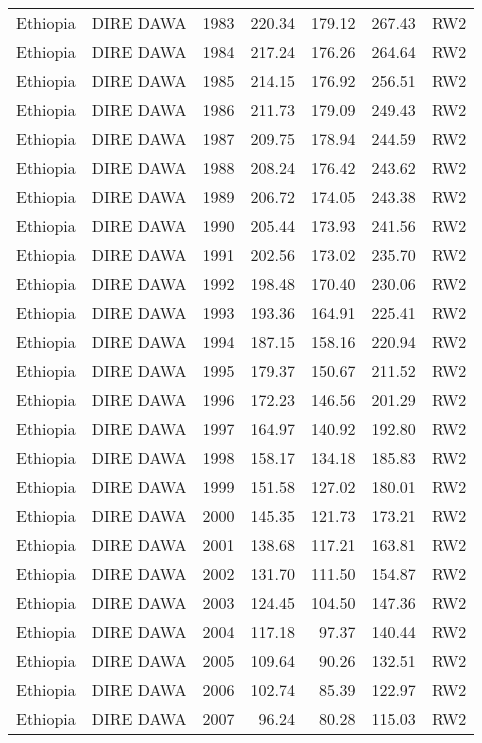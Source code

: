 \begin{longtable}{lllrrrl}
  Ethiopia & DIRE DAWA & 1983 & 220.34 & 179.12 & 267.43 & RW2 \\ 
  Ethiopia & DIRE DAWA & 1984 & 217.24 & 176.26 & 264.64 & RW2 \\ 
  Ethiopia & DIRE DAWA & 1985 & 214.15 & 176.92 & 256.51 & RW2 \\ 
  Ethiopia & DIRE DAWA & 1986 & 211.73 & 179.09 & 249.43 & RW2 \\ 
  Ethiopia & DIRE DAWA & 1987 & 209.75 & 178.94 & 244.59 & RW2 \\ 
  Ethiopia & DIRE DAWA & 1988 & 208.24 & 176.42 & 243.62 & RW2 \\ 
  Ethiopia & DIRE DAWA & 1989 & 206.72 & 174.05 & 243.38 & RW2 \\ 
  Ethiopia & DIRE DAWA & 1990 & 205.44 & 173.93 & 241.56 & RW2 \\ 
  Ethiopia & DIRE DAWA & 1991 & 202.56 & 173.02 & 235.70 & RW2 \\ 
  Ethiopia & DIRE DAWA & 1992 & 198.48 & 170.40 & 230.06 & RW2 \\ 
  Ethiopia & DIRE DAWA & 1993 & 193.36 & 164.91 & 225.41 & RW2 \\ 
  Ethiopia & DIRE DAWA & 1994 & 187.15 & 158.16 & 220.94 & RW2 \\ 
  Ethiopia & DIRE DAWA & 1995 & 179.37 & 150.67 & 211.52 & RW2 \\ 
  Ethiopia & DIRE DAWA & 1996 & 172.23 & 146.56 & 201.29 & RW2 \\ 
  Ethiopia & DIRE DAWA & 1997 & 164.97 & 140.92 & 192.80 & RW2 \\ 
  Ethiopia & DIRE DAWA & 1998 & 158.17 & 134.18 & 185.83 & RW2 \\ 
  Ethiopia & DIRE DAWA & 1999 & 151.58 & 127.02 & 180.01 & RW2 \\ 
  Ethiopia & DIRE DAWA & 2000 & 145.35 & 121.73 & 173.21 & RW2 \\ 
  Ethiopia & DIRE DAWA & 2001 & 138.68 & 117.21 & 163.81 & RW2 \\ 
  Ethiopia & DIRE DAWA & 2002 & 131.70 & 111.50 & 154.87 & RW2 \\ 
  Ethiopia & DIRE DAWA & 2003 & 124.45 & 104.50 & 147.36 & RW2 \\ 
  Ethiopia & DIRE DAWA & 2004 & 117.18 & 97.37 & 140.44 & RW2 \\ 
  Ethiopia & DIRE DAWA & 2005 & 109.64 & 90.26 & 132.51 & RW2 \\ 
  Ethiopia & DIRE DAWA & 2006 & 102.74 & 85.39 & 122.97 & RW2 \\ 
  Ethiopia & DIRE DAWA & 2007 & 96.24 & 80.28 & 115.03 & RW2 \\ 

\end{longtable}
